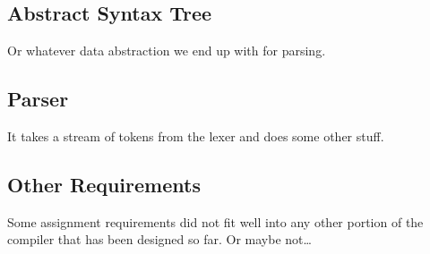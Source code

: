 \documentclass[pdftex,12pt,a4paper]{article}
\begin{document}
\subsection{Abstract Syntax Tree}

Or whatever data abstraction we end up with for parsing.


\subsection{Parser}

It takes a stream of tokens from the lexer and does some other stuff.


\subsection{Other Requirements}

Some assignment requirements did not fit well into any other portion
of the compiler that has been designed so far. Or maybe not\ldots
\end{document}
